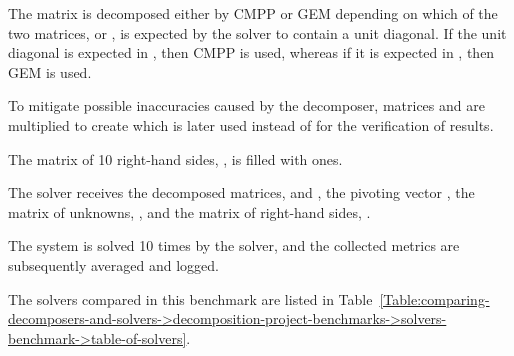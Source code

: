 \begin{tight_enumerate}
	\item The matrix is decomposed either by CMPP or GEM depending on which of the two matrices,  or , is expected by the solver to contain a unit diagonal.
If the unit diagonal is expected in , then CMPP is used, whereas if it is expected in , then GEM is used.
	\item To mitigate possible inaccuracies caused by the decomposer, matrices  and  are multiplied to create  which is later used instead of  for the verification of results.
	\item The matrix of 10 right-hand sides, , is filled with ones.
	\item The solver receives the decomposed matrices,  and , the pivoting vector , the matrix of unknowns, , and the matrix of right-hand sides, .
	\item The system is solved 10 times by the solver, and the collected metrics are subsequently averaged and logged.
\end{tight_enumerate}

The solvers compared in this benchmark are listed in Table~\ref{Table:comparing-decomposers-and-solvers->decomposition-project-benchmarks->solvers-benchmark->table-of-solvers}.

